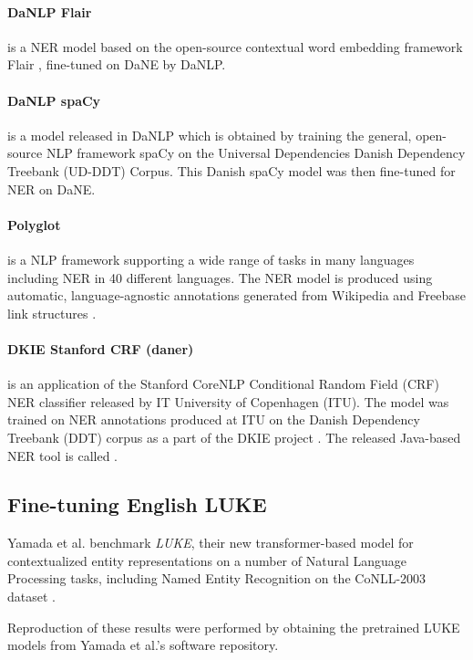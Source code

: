 \documentclass[main.tex]{subfiles}
\begin{document}
\paragraph{DaNLP Flair}
is a NER model based on the open-source contextual word embedding framework Flair \cite{akbik2019flair}, fine-tuned on DaNE by DaNLP.

\paragraph{DaNLP spaCy}
is a model released in DaNLP which is obtained by training the general, open-source NLP framework spaCy \cite{honnibal2020spacy} on the Universal Dependencies Danish Dependency Treebank (UD-DDT) Corpus\cite{johann2015udddt}.
This Danish spaCy model was then fine-tuned for NER on DaNE.

\paragraph{Polyglot}
is a NLP framework supporting a wide range of tasks in many languages including NER in 40 different languages.
The NER model is produced using automatic, language-agnostic annotations generated from Wikipedia and Freebase link structures \cite{rfou2015polyglot}.

\paragraph{DKIE Stanford CRF (daner)}
is an application of the Stanford CoreNLP Conditional Random Field (CRF) NER classifier \cite{manning2014corenlp} released by IT University of Copenhagen (ITU).
The model was trained on NER annotations produced at ITU on the Danish Dependency Treebank (DDT) corpus \cite{kromann2003ddt} as a part of the DKIE project \cite{derc2014dkie}.
The released Java-based NER tool is called \footnotemark.


\subsection{Fine-tuning English LUKE}
Yamada et al. benchmark \emph{LUKE}, their new transformer-based model for contextualized entity representations on a number of Natural Language Processing tasks, including Named Entity Recognition on the CoNLL-2003 dataset \cite{yamada2020luke}.

Reproduction of these results were performed by obtaining the pretrained LUKE models from Yamada et al.'s software repository.
\end{document}
